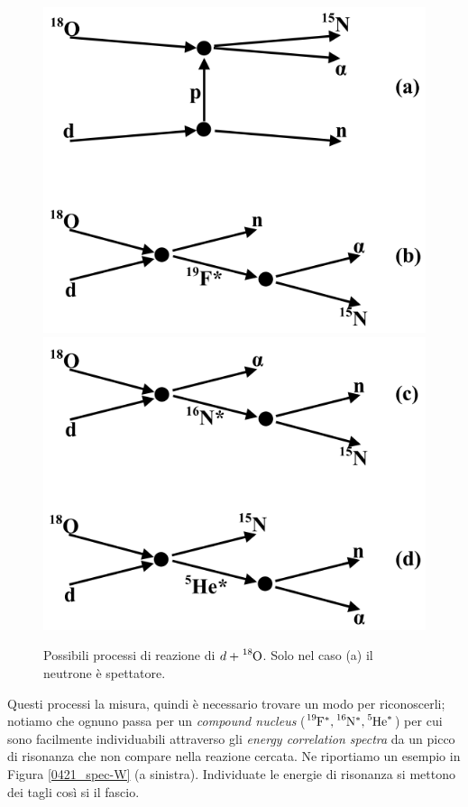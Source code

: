 \begin{figure}[h]
	\centering
	\includegraphics[scale=0.5]{Immagini/0421_sch-cut1.png}
	\includegraphics[scale=0.5]{Immagini/0421_sch-cut2.png}
	\caption{Possibili processi di reazione di $d+\ce{^{18}O}$. Solo nel caso (a) il neutrone è spettatore.}
	\label{0421_sch}
\end{figure}
\noindent Questi processi  la misura, quindi è necessario trovare un modo per riconoscerli; notiamo che ognuno passa per un \textit{compound nucleus} ($\ce{^{19}F}^*, \ce{^{16}N}^*,\ce{^5He}^*$) per cui sono facilmente individuabili attraverso gli \textit{energy correlation spectra} da un picco di risonanza che non compare nella reazione cercata. Ne riportiamo un esempio in Figura \ref{0421_spec-W} (a sinistra). Individuate le energie di risonanza si mettono dei tagli così si  il fascio.
